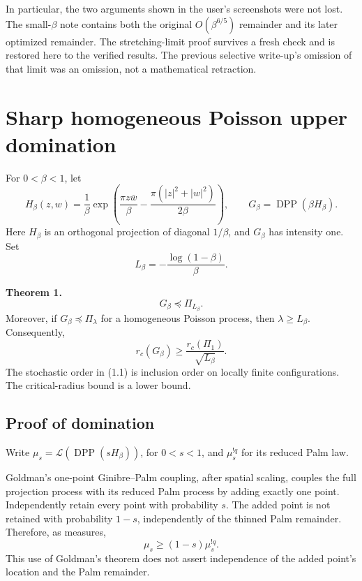 \documentclass[11pt,a4paper]{article}
\theoremstyle{definition}
\theoremstyle{remark}
\numberwithin{equation}{section}
\begin{document}
In particular, the two arguments shown in the user's screenshots were
not lost. The small-\(\beta\) note contains both the original
\(O(\beta^{6/5})\) remainder and its later optimized remainder.
The stretching-limit proof survives a fresh check and is restored here
to the verified results. The previous selective write-up's omission of
that limit was an omission, not a mathematical retraction.
\clearpage


\hypertarget{sharp-homogeneous-poisson-upper-domination}{%
\section{Sharp homogeneous Poisson upper domination}\label{sharp-homogeneous-poisson-upper-domination}}

For \(0<\beta<1\), let \[
H_\beta(z,w)=\frac1\beta
\exp\!\left(\frac{\pi z\bar w}{\beta}
 -\frac{\pi(|z|^2+|w|^2)}{2\beta}\right),\qquad
G_\beta=\operatorname{DPP}(\beta H_\beta).
\] Here \(H_\beta\) is an orthogonal projection of diagonal \(1/\beta\), and \(G_\beta\) has intensity one. Set \[
L_\beta=-\frac{\log(1-\beta)}{\beta}.
\]

\textbf{Theorem 1.} \[
G_\beta\preceq\Pi_{L_\beta}.
\tag{1.1}
\] Moreover, if \(G_\beta\preceq\Pi_\lambda\) for a homogeneous Poisson process, then \(\lambda\ge L_\beta\). Consequently, \[
\boxed{\quad
r_c(G_\beta)\ge\frac{r_c(\Pi_1)}{\sqrt{L_\beta}}.
\quad}
\tag{1.2}
\] The stochastic order in (1.1) is inclusion order on locally finite configurations. The critical-radius bound is a lower bound.

\hypertarget{proof-of-domination}{%
\subsection{Proof of domination}\label{proof-of-domination}}

Write \(\mu_s=\mathcal L(\operatorname{DPP}(sH_\beta))\), for \(0<s<1\), and \(\mu_s^{!q}\) for its reduced Palm law.

Goldman's one-point Ginibre--Palm coupling, after spatial scaling, couples the full projection process with its reduced Palm process by adding exactly one point. Independently retain every point with probability \(s\). The added point is not retained with probability \(1-s\), independently of the thinned Palm remainder. Therefore, as measures, \[
\mu_s\ge(1-s)\mu_s^{!q}.
\tag{1.3}
\] This use of Goldman's theorem does not assert independence of the added point's location and the Palm remainder.
\end{document}
